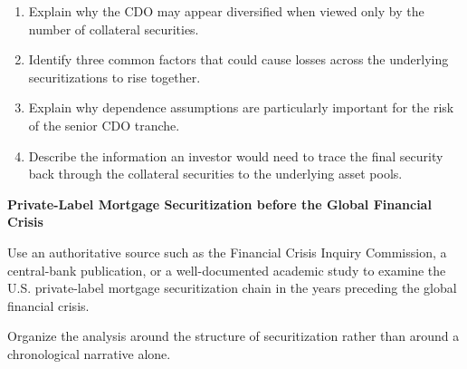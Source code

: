 \begin{enumerate}
\begin{enumerate}

\item Explain why the CDO may appear diversified when viewed only by the number of collateral securities.

\item Identify three common factors that could cause losses across the underlying securitizations to rise together.

\item Explain why dependence assumptions are particularly important for the risk of the senior CDO tranche.

\item Describe the information an investor would need to trace the final security back through the collateral securities to the underlying asset pools.

\end{enumerate}

\end{enumerate}





\textbf{Private-Label Mortgage Securitization before the Global Financial Crisis}

Use an authoritative source such as the Financial Crisis Inquiry Commission, a central-bank publication, or a well-documented academic study to examine the U.S. private-label mortgage securitization chain in the years preceding the global financial crisis.

Organize the analysis around the structure of securitization rather than around a chronological narrative alone.

